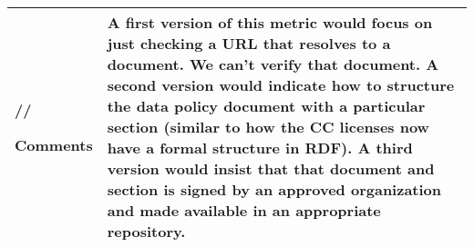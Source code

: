 \documentclass[english]{article}
\begin{document}
\begin{tabular}{|p{5cm}|p{9cm}|}
//



\hline

Comments & 

A first version of this metric would focus on just checking a URL that resolves to a document. We can’t verify that document. \newline
A second version would indicate how to structure the data policy document with a particular section (similar to how the CC licenses now have a formal structure in RDF).\newline
A third version would insist that that document and section is signed by an approved organization and made available in an appropriate repository. \\ 
\hline
\end{tabular}
\end{document}
